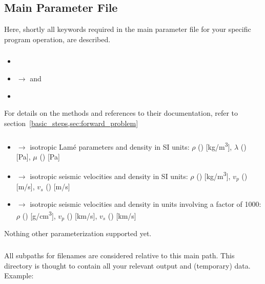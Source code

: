 \subsection{Main Parameter File} \label{files,sec:main_parfile}
%
Here, shortly all keywords required in the main parameter file for your specific program operation, are described.
\subsubsection{} \label{files,sec:main_parfile,itm:forward_method}
\begin{itemize}
\item[] 
\item[]  $\rightarrow$  and 
\item[]  
\end{itemize}
For details on the methods and references to their documentation, refer to section~\ref{basic_steps,sec:forward_problem}
\subsubsection{} \label{files,sec:main_parfile,itm:mod_pmtrz}
\begin{itemize}
\item[]  $\rightarrow$ isotropic Lam\'e parameters and density in SI units: 
    $\rho$ () [kg/m\textsuperscript{3}], $\lambda$ () [Pa], $\mu$ ()  [Pa]
\item[]  $\rightarrow$ isotropic seismic velocities and density in SI units:
    $\rho$ () [kg/m\textsuperscript{3}], $v_p$ () [m/s], $v_s$ () [m/s]
\item[]  $\rightarrow$ isotropic seismic velocities and density in  
  units involving a factor of 1000: $\rho$ () [g/cm\textsuperscript{3}], $v_p$ () [km/s], 
  $v_s$ () [km/s]
\end{itemize}
Nothing other parameterization supported yet.
\subsubsection{} \label{files,sec:main_parfile,itm:main_path}
All subpaths for filenames are considered relative to this main path. This
directory is thought to contain all your relevant output and (temporary) data.\\
Example: 

